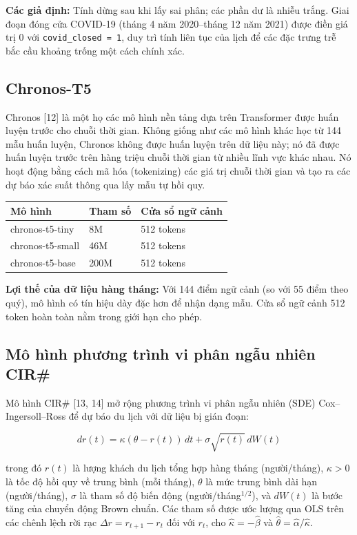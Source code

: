 \documentclass[
]{article}
\begin{document}
\textbf{Các giả định:} Tính dừng sau khi lấy sai phân; các phần dư là
nhiễu trắng. Giai đoạn đóng cửa COVID-19 (tháng 4 năm 2020--tháng 12 năm
2021) được điền giá trị 0 với \texttt{covid\_closed\ =\ 1}, duy trì tính
liên tục của lịch để các đặc trưng trễ bắc cầu khoảng trống một cách
chính xác.

\subsection{Chronos-T5}\label{chronos-t5}

Chronos {[}12{]} là một họ các mô hình nền tảng dựa trên Transformer
được huấn luyện trước cho chuỗi thời gian. Không giống như các mô hình
khác học từ 144 mẫu huấn luyện, Chronos không được huấn luyện trên dữ
liệu này; nó đã được huấn luyện trước trên hàng triệu chuỗi thời gian từ
nhiều lĩnh vực khác nhau. Nó hoạt động bằng cách mã hóa (tokenizing) các
giá trị chuỗi thời gian và tạo ra các dự báo xác suất thông qua lấy mẫu
tự hồi quy.

\begin{longtable}[]{@{}lll@{}}
\toprule\noalign{}
Mô hình & Tham số & Cửa sổ ngữ cảnh \\
\midrule\noalign{}
\endhead
\bottomrule\noalign{}
\endlastfoot
chronos-t5-tiny & 8M & 512 tokens \\
chronos-t5-small & 46M & 512 tokens \\
chronos-t5-base & 200M & 512 tokens \\
\end{longtable}

\textbf{Lợi thế của dữ liệu hàng tháng:} Với 144 điểm ngữ cảnh (so với
55 điểm theo quý), mô hình có tín hiệu dày đặc hơn để nhận dạng mẫu. Cửa
sổ ngữ cảnh 512 token hoàn toàn nằm trong giới hạn cho phép.

\subsection{Mô hình phương trình vi phân ngẫu nhiên
CIR\#}\label{muxf4-huxecnh-phux1b0ux1a1ng-truxecnh-vi-phuxe2n-ngux1eabu-nhiuxean-cir}

Mô hình CIR\# {[}13, 14{]} mở rộng phương trình vi phân ngẫu nhiên (SDE)
Cox--Ingersoll--Ross để dự báo du lịch với dữ liệu bị gián đoạn:

\[dr(t) = \kappa(\theta - r(t))\,dt + \sigma\sqrt{r(t)}\,dW(t)\]

trong đó \(r(t)\) là lượng khách du lịch tổng hợp hàng tháng
(người/tháng), \(\kappa > 0\) là tốc độ hồi quy về trung bình (mỗi
tháng), \(\theta\) là mức trung bình dài hạn (người/tháng), \(\sigma\)
là tham số độ biến động (người/tháng\(^{1/2}\)), và \(dW(t)\) là bước
tăng của chuyển động Brown chuẩn. Các tham số được ước lượng qua OLS
trên các chênh lệch rời rạc \(\Delta r = r_{t+1} - r_t\) đối với
\(r_t\), cho \(\hat{\kappa} = -\hat{\beta}\) và
\(\hat{\theta} = \hat{\alpha}/\hat{\kappa}\).
\end{document}
